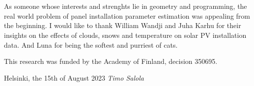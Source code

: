 \hypertarget{prefacepage}{}
%
\section*{\prefacename}
As someone whose interests and strenghts lie in geometry and programming, the real world problem of panel installation parameter estimation was appealing from the beginning. I would like to thank William Wandji and Juha Karhu for their insights on the effects of clouds, snows and temperature on solar PV installation data. And Luna for being the softest and purriest of cats.

\noindent This research was funded by the Academy of Finland, decision 350695.


\vspace{9mm}
\noindent
Helsinki, the 15th of August 2023 %
%
%
\vspace{11mm}
\hspace{1.6cm}\emph{Timo Salola}

\vfill















